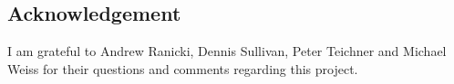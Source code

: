 
\subsection*{Acknowledgement}

I am grateful to Andrew Ranicki, Dennis Sullivan, Peter Teichner and Michael Weiss for their questions and comments regarding this project.

